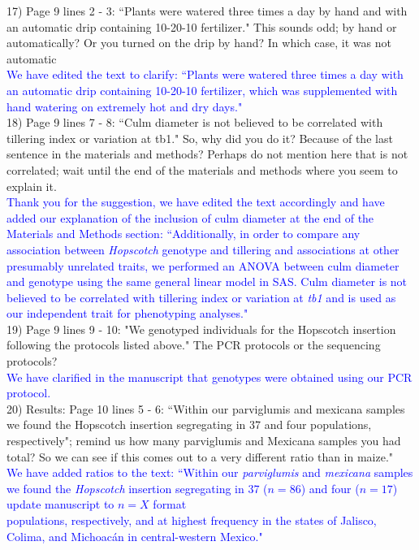 \documentclass[11pt]{article}
\newcommand{\res}[1]{\noindent \textcolor{blue}{{#1}} \\}
\newcommand{\mbh}[1]{\noindent \textcolor{Dandelion}{{#1}}\\}
\begin{document}
17) Page 9 lines 2 - 3: ``Plants were watered three times a day by hand and with an automatic drip containing 10-20-10 fertilizer." This sounds odd; by hand or automatically? Or you turned on the drip by hand? In which case, it was not automatic\\

\res{We have edited the text to clarify: ``Plants were watered three times a day with an automatic drip containing 10-20-10 fertilizer, which was supplemented with hand watering on extremely hot and dry days."}

18) Page 9 lines 7 - 8: ``Culm diameter is not believed to be correlated with tillering index or variation at tb1." So, why did you do it? Because of the last sentence in the materials and methods? Perhaps do not mention here that is not correlated; wait until the end of the materials and methods where you seem to explain it.\\ 

\res{Thank you for the suggestion, we have edited the text accordingly and have added our explanation of the inclusion of culm diameter at the end of the Materials and Methods section: ``Additionally, in order to compare any association between \emph{Hopscotch} genotype and tillering and associations at other presumably unrelated traits, we performed an ANOVA between culm diameter and genotype using the same general linear model in SAS. Culm diameter is not believed to be correlated with tillering index or variation at \emph{tb1} and is used as our independent trait for phenotyping analyses."}

19) Page 9 lines 9 - 10: "We genotyped individuals for the Hopscotch insertion following the protocols listed above." The PCR protocols or the sequencing protocols?\\ 

\res{We have clarified in the manuscript that genotypes were obtained using our PCR protocol.}

20) Results:
Page 10 lines 5 - 6: ``Within our parviglumis and mexicana samples we found the Hopscotch insertion segregating in 37 and four populations, respectively"; remind us how many parviglumis and Mexicana samples you had total? So we can see if this comes out to a very different ratio than in maize."\\ 

\res{We have added ratios to the text: ``Within our \emph{parviglumis} and \emph{mexicana} samples we found the \emph{Hopscotch} insertion segregating in 37 ($n=86$) and four ($n=17$) \mbh{update manuscript to $n=X$ format} populations, respectively, and at highest frequency in the states of Jalisco, Colima, and Michoac\'{a}n in central-western Mexico."}
\end{document}
